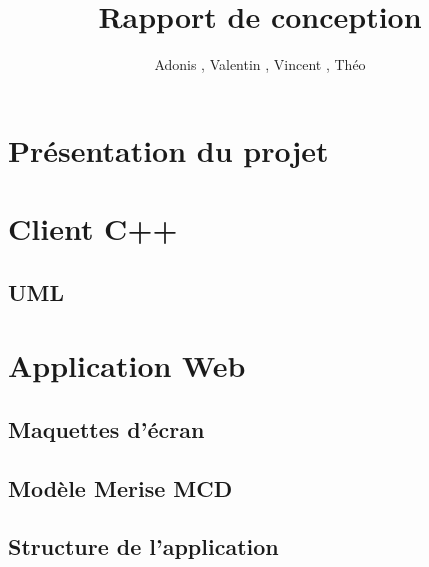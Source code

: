 \documentclass{report}
\title{Rapport de conception}
\author{Adonis \bsc{Najimi}, Valentin \bsc{Stern}, Vincent \bsc{Albert}, Théo \bsc{Gerriet}}
\begin{document}
\section{Présentation du projet}
\section{Client C++}
\subsection{UML}
\section{Application Web}
\subsection{Maquettes d'écran}
\subsection{Modèle Merise MCD}
\subsection{Structure de l'application}
\end{document}
